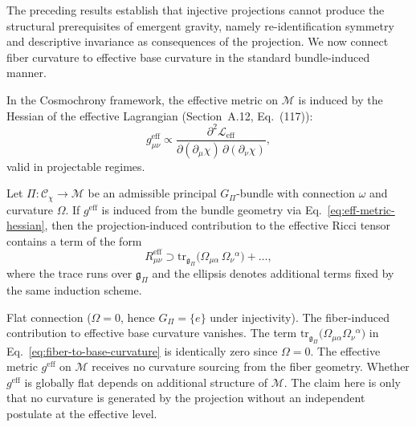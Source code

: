     The preceding results establish that injective projections cannot produce the structural prerequisites of emergent gravity,
    namely re-identification symmetry and descriptive invariance as consequences of the projection.
    We now connect fiber curvature to effective base curvature in the standard bundle-induced manner.

    In the Cosmochrony framework, the effective metric on $\mathcal{M}$ is induced by the Hessian of the effective Lagrangian
    (Section~A.12, Eq.~(117)):
    \begin{equation}
      g^\mathrm{eff}_{\mu\nu}
      \propto
      \frac{\partial^2 \mathcal{L}_\mathrm{eff}}
      {\partial(\partial_\mu \chi)\,\partial(\partial_\nu \chi)},
      \label{eq:eff-metric-hessian}
    \end{equation}
    valid in projectable regimes.

    \begin{proposition}
      \label{prop:fiber-base-curvature}
      Let $\Pi : \mathcal{C}_\chi \to \mathcal{M}$ be an admissible principal $G_\Pi$-bundle with connection $\omega$
      and curvature $\Omega$.
      If $g^\mathrm{eff}$ is induced from the bundle geometry via Eq.~\eqref{eq:eff-metric-hessian},
      then the projection-induced contribution to the effective Ricci tensor contains a term of the form
      \begin{equation}
        R^\mathrm{eff}_{\mu\nu}
        \supset
        \mathrm{tr}_{\mathfrak{g}_\Pi}\!\bigl(\Omega_{\mu\alpha}\,\Omega_\nu{}^\alpha\bigr) + \ldots,
        \label{eq:fiber-to-base-curvature}
      \end{equation}
      where the trace runs over $\mathfrak{g}_\Pi$ and the ellipsis denotes additional terms fixed by the same induction scheme.

      Flat connection ($\Omega = 0$, hence $G_\Pi = \{e\}$ under injectivity).
      The fiber-induced contribution to effective base curvature vanishes.
      The term
      $\mathrm{tr}_{\mathfrak{g}_\Pi}\!\bigl(\Omega_{\mu\alpha}\Omega_\nu{}^\alpha\bigr)$
      in Eq.~\eqref{eq:fiber-to-base-curvature} is identically zero since $\Omega = 0$.
      The effective metric $g^\mathrm{eff}$ on $\mathcal{M}$ receives no curvature sourcing
      from the fiber geometry.
      Whether $g^\mathrm{eff}$ is globally flat depends on additional structure of $\mathcal{M}$.
      The claim here is only that no curvature is generated by the projection without an independent postulate at the
      effective level.
    \end{proposition}

